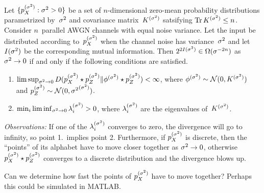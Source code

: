 \documentclass[review]{ipgthesis}
\begin{document}
\setcounter{chapter}{1}
\def\px{p_X}
\newcommand{\is}{^{(\sq)}}

\begin{lemma}
  Let $\{ \px\is : \sq > 0 \}$ be a set of $n$-dimensional zero-mean probability
  distributions parametrized by~${\sigma^2}$ and covariance matrix~$K\is$ satsifying
  $\Tr K\is \le n$. Consider $n$~parallel AWGN channels with equal noise
  variance. Let the input be distributed according to~$\px\is$ when the channel
  noise has variance~${\sigma^2}$ and let $I({\sigma^2})$ be the corresponding mutual
  information. Then $2^{2I({\sigma^2})} \in \Omega(\sigma^{-2n})$ as ${\sigma^2} \rightarrow 0$ if
  and only if the following conditions are satisfied. 
  \begin{enumerate}
    \item $\limsup_{\sq \goesto 0} D(\px\is \star p_Z\is \| \phi\is \star
      p_Z\is) < \infty$, where
      $\phi\is \sim \N(0,K\is)$ and $p_Z\is \sim \N(0,\sq\is)$.
    \item $\min_i \liminf_{\sq \goesto 0} \lambda_i\is > 0$, where
      $\lambda_i\is$ are the eigenvalues of~$K\is$.
  \end{enumerate}
\end{lemma}

\emph{Observations:} If one of the $\lambda_i\is$ converges to zero, the
divergence will go to infinity, so point 1.\ implies point 2.  Furthermore, if
$p_X\is$ is discrete, then the ``points'' of its alphabet have to move closer
together as ${\sigma^2} \rightarrow 0$, otherwise $\px\is \star p_Z\is$ converges to a
discrete distribution and the divergence blows up.

Can we determine how fast the points of $\px\is$ have to move together? Perhaps
this could be simulated in MATLAB.
\end{document}
